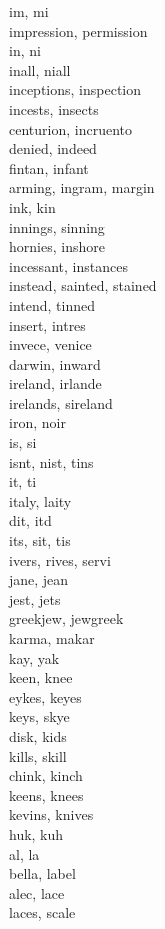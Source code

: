 im, mi\\
impression, permission\\
in, ni\\
inall, niall\\
inceptions, inspection\\
incests, insects\\
centurion, incruento\\
denied, indeed\\
fintan, infant\\
arming, ingram, margin\\
ink, kin\\
innings, sinning\\
hornies, inshore\\
incessant, instances\\
instead, sainted, stained\\
intend, tinned\\
insert, intres\\
invece, venice\\
darwin, inward\\
ireland, irlande\\
irelands, sireland\\
iron, noir\\
is, si\\
isnt, nist, tins\\
it, ti\\
italy, laity\\
dit, itd\\
its, sit, tis\\
ivers, rives, servi\\
jane, jean\\
jest, jets\\
greekjew, jewgreek\\
karma, makar\\
kay, yak\\
keen, knee\\
eykes, keyes\\
keys, skye\\
disk, kids\\
kills, skill\\
chink, kinch\\
keens, knees\\
kevins, knives\\
huk, kuh\\
al, la\\
bella, label\\
alec, lace\\
laces, scale\\
